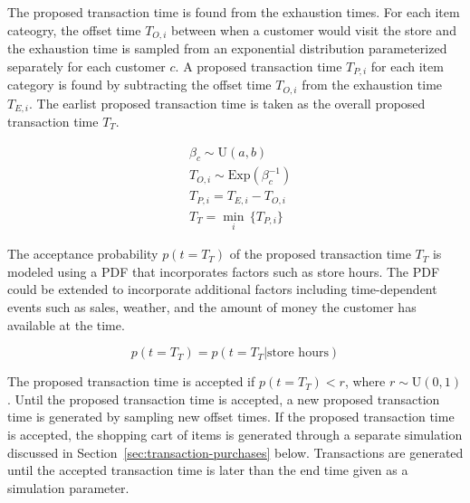 \documentclass[conference]{IEEEtran}
\begin{document}
The proposed transaction time is found from the exhaustion times.  For each item cateogry, the offset time $T_{O, i}$ between when a customer would visit the store and the exhaustion time is sampled from an exponential distribution parameterized separately for each customer $c$. A proposed transaction time $T_{P, i}$ for each item category is found by subtracting the offset time $T_{O, i}$ from the exhaustion time $T_{E, i}$.  The earlist proposed transaction time is taken as the overall proposed transaction time $T_T$.

\begin{align}
&\beta_c \sim \text{U}(a, b) \\
&T_{O, i} \sim \text{Exp}(\beta^{-1}_c) \\
&T_{P, i} = T_{E,i} - T_{O, i} \\
&T_T = \min_i \, \{  T_{P, i}\}
\end{align}

The acceptance probability $p(t=T_T)$ of the proposed transaction time $T_T$ is modeled using a PDF that incorporates factors such as store hours.  The PDF could be extended to incorporate additional factors including time-dependent events such as sales, weather, and the amount of money the customer has available at the time.

\begin{equation}
p(t=T_T) = p(t=T_T | \text{store hours})
\end{equation}

The proposed transaction time is accepted if $p(t=T_T) < r$, where $r \sim \text{U}(0, 1)$. Until the proposed transaction time is accepted, a new proposed transaction time is generated by sampling new offset times. If the proposed transaction time is accepted, the shopping cart of items is generated through a separate simulation discussed in Section~\ref{sec:transaction-purchases} below. Transactions are generated until the accepted transaction time is later than the end time given as a simulation parameter.
\end{document}
